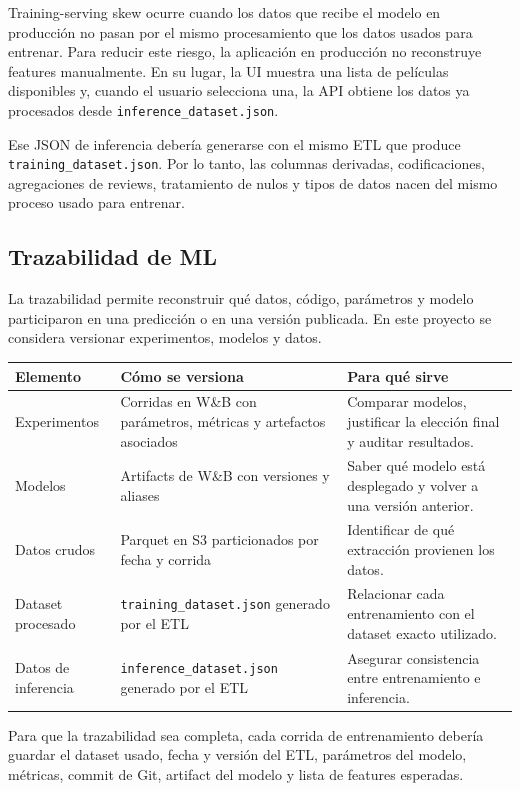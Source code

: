 \documentclass[letterpaper,12pt]{article}
\begin{document}
Training-serving skew ocurre cuando los datos que recibe el modelo en producción no pasan por el mismo procesamiento que los datos usados para entrenar. Para reducir este riesgo, la aplicación en producción no reconstruye features manualmente. En su lugar, la UI muestra una lista de películas disponibles y, cuando el usuario selecciona una, la API obtiene los datos ya procesados desde \texttt{inference\_dataset.json}.

Ese JSON de inferencia debería generarse con el mismo ETL que produce \texttt{training\_dataset.json}. Por lo tanto, las columnas derivadas, codificaciones, agregaciones de reviews, tratamiento de nulos y tipos de datos nacen del mismo proceso usado para entrenar.

\subsection{Trazabilidad de ML}
\label{sec:trazabilidad}

La trazabilidad permite reconstruir qué datos, código, parámetros y modelo participaron en una predicción o en una versión publicada. En este proyecto se considera versionar experimentos, modelos y datos.

\begin{longtable}{p{4cm}p{6cm}p{6cm}}
\toprule
\textbf{Elemento} & \textbf{Cómo se versiona} & \textbf{Para qué sirve} \\
\midrule
Experimentos & Corridas en W\&B con parámetros, métricas y artefactos asociados & Comparar modelos, justificar la elección final y auditar resultados. \\
Modelos & Artifacts de W\&B con versiones y aliases & Saber qué modelo está desplegado y volver a una versión anterior. \\
Datos crudos & Parquet en S3 particionados por fecha y corrida & Identificar de qué extracción provienen los datos. \\
Dataset procesado & \texttt{training\_dataset.json} generado por el ETL & Relacionar cada entrenamiento con el dataset exacto utilizado. \\
Datos de inferencia & \texttt{inference\_dataset.json} generado por el ETL & Asegurar consistencia entre entrenamiento e inferencia. \\
\bottomrule
\end{longtable}

Para que la trazabilidad sea completa, cada corrida de entrenamiento debería guardar el dataset usado, fecha y versión del ETL, parámetros del modelo, métricas, commit de Git, artifact del modelo y lista de features esperadas.
\end{document}
